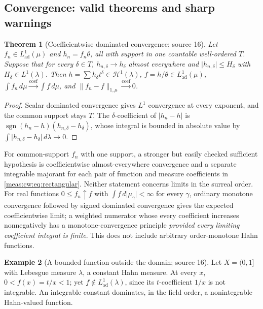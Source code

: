 \documentclass[11pt]{article}
\numberwithin{equation}{section}
\newtheorem{theorem}{Theorem}[section]
\theoremstyle{definition}
\newtheorem{example}[theorem]{Example}
\theoremstyle{remark}
\newcommand{\norm}[1]{\lVert#1\rVert}
\newcommand{\abs}[1]{\lvert#1\rvert}
\newcommand{\tocoef}{\xrightarrow{\mathrm{coef}}}
\newcommand{\Lad}{L^1_{\mathrm{ad}}}
\newcommand{\Hone}[1]{\mathscr H^1(#1)}
\begin{document}
\subsection{Convergence: valid theorems and sharp warnings}

\begin{theorem}[Coefficientwise dominated convergence; source 16]\label{meas:cw:thm:dct}
Let $f_n\in\Lad(\mu)$ and $h_n=f_n\theta$, all with support in one countable
well-ordered $T$. Suppose that for every $\delta\in T$, $h_{n,\delta}\to h_\delta$
almost everywhere and $\abs{h_{n,\delta}}\le H_\delta$ with $H_\delta\in L^1(\lambda)$. Then
$h=\sum h_\delta t^\delta\in\Hone{\lambda}$, $f=h/\theta\in\Lad(\mu)$,
$\int f_n\,d\mu\tocoef\int f\,d\mu$, and $\norm{f_n-f}_{1,\mu}\tocoef0$.
\end{theorem}
\begin{proof}
Scalar dominated convergence gives $L^1$ convergence at every exponent, and the
common support stays $T$. The $\delta$-coefficient of $\abs{h_n-h}$ is
$\operatorname{sgn}(h_n-h)(h_{n,\delta}-h_\delta)$, whose integral is bounded in absolute
value by $\int\abs{h_{n,\delta}-h_\delta}\,d\lambda\to0$.
\end{proof}

For common-support $f_n$ with one support, a stronger but easily checked
sufficient hypothesis is coefficientwise almost-everywhere convergence and a
separate integrable majorant for each pair of function and measure coefficients
in \eqref{meas:cw:eq:rectangular}. Neither statement concerns limits in the
surreal order. For real functions $0\le f_n\uparrow f$ with $\int f\,d\abs{\mu_\gamma}<\infty$
for every $\gamma$, ordinary monotone convergence followed by signed dominated
convergence gives the expected coefficientwise limit; a weighted numerator whose
every coefficient increases nonnegatively has a monotone-convergence principle
\emph{provided every limiting coefficient integral is finite}. This does not
include arbitrary order-monotone Hahn functions.

\begin{example}[A bounded function outside the domain; source 16]
\label{meas:cw:ex:bounded-fail}
Let $X=(0,1]$ with Lebesgue measure $\lambda$, a constant Hahn measure. At every
$x$, $0<f(x)=t/x<1$; yet $f\notin\Lad(\lambda)$, since its $t$-coefficient $1/x$ is
not integrable. An integrable constant dominates, in the field order, a
nonintegrable Hahn-valued function.
\end{example}
\end{document}
